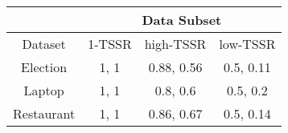 \begin{tabular}{|c|c|c|c|}
\hline
            &  \multicolumn{3}{c|}{Data Subset} \\
\hline 
Dataset &  1-TSSR &   high-TSSR &  low-TSSR \\ 
\hline
Election   &     1, 1 &        0.88, 0.56 &       0.5, 0.11 \\
\hline  
Laptop     &     1, 1 &         0.8, 0.6 &        0.5, 0.2 \\
\hline  
Restaurant &     1, 1 &         0.86, 0.67 &       0.5, 0.14 \\
\hline 
\end{tabular}